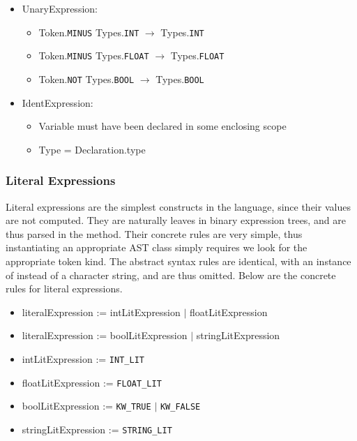 \begin{itemize}
	\item UnaryExpression:
		\begin{itemize}
			\item Token.\texttt{MINUS} Types.\texttt{INT} $\to$ Types.\texttt{INT}
			\item Token.\texttt{MINUS} Types.\texttt{FLOAT} $\to$ Types.\texttt{FLOAT}
			\item Token.\texttt{NOT} Types.\texttt{BOOL} $\to$ Types.\texttt{BOOL}
		\end{itemize}
	\item IdentExpression:
		\begin{itemize}
			\item Variable must have been declared in some enclosing scope
			\item Type = Declaration.type
		\end{itemize}
\end{itemize}

\subsubsection{Literal Expressions}

Literal expressions are the simplest constructs in the language, since their values are not computed. They are naturally leaves in binary expression trees, and are thus parsed in the  method. Their concrete rules are very simple, thus instantiating an appropriate AST class simply requires we look for the appropriate token kind. The abstract syntax rules are identical, with an instance of  instead of a character string, and are thus omitted. Below are the concrete rules for literal expressions.

\begin{itemize}
	\item literalExpression := intLitExpression $|$ floatLitExpression
	\item literalExpression := boolLitExpression $|$ stringLitExpression
	\item intLitExpression := \texttt{INT\_LIT}
	\item floatLitExpression := \texttt{FLOAT\_LIT}
	\item boolLitExpression := \texttt{KW\_TRUE} $|$ \texttt{KW\_FALSE}
	\item stringLitExpression := \texttt{STRING\_LIT}
\end{itemize}

